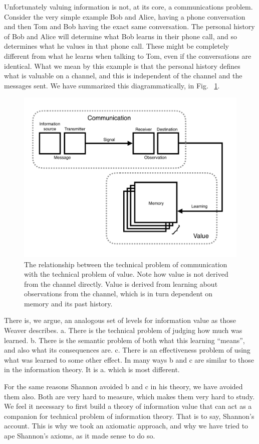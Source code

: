 Unfortunately valuing information is not, at its core, a communications problem. Consider the very simple example Bob and Alice, having a phone conversation and then Tom and Bob having the exact same conversation. The personal history of Bob and Alice will determine what Bob learns in their phone call, and so determines what he values in that phone call. These might be completely different from what he learns when talking to Tom, even if the conversations are identical. What we mean by this example is that the personal history defines what is valuable on a channel, and this is independent of the channel and the messages sent. We have summarized this diagrammatically, in Fig. ~\ref{fig:info1}.

\begin{figure}
\begin{fullwidth}
	\includegraphics[width=0.6\linewidth]{img/info_diagram.pdf} 
    \caption{The relationship between the technical problem of communication with the technical problem of value. Note how value is not derived from the channel directly. Value is derived from learning about observations from the channel, which is in turn dependent on memory and its past history.
    }
    \label{fig:info1} 
\end{fullwidth}
\end{figure}

There is, we argue, an analogous set of levels for information value as those Weaver describes. a. There is the technical problem of judging how much was learned. b. There is the semantic problem of both what this learning ``means'', and also what its consequences are. c. There is an effectiveness problem of using what was learned to some other effect. In many ways b and c are similar to those in the information theory. It is a. which is most different. 

For the same reasons Shannon avoided b and c in his theory, we have avoided them also. Both are very hard to measure, which makes them very hard to study. We feel it necessary to first build a theory of information value that can act as a companion for technical problem of information theory. That is to say, Shannon's account. This is why we took an axiomatic approach, and why we have tried to ape Shannon's axioms, as it made sense to do so.


